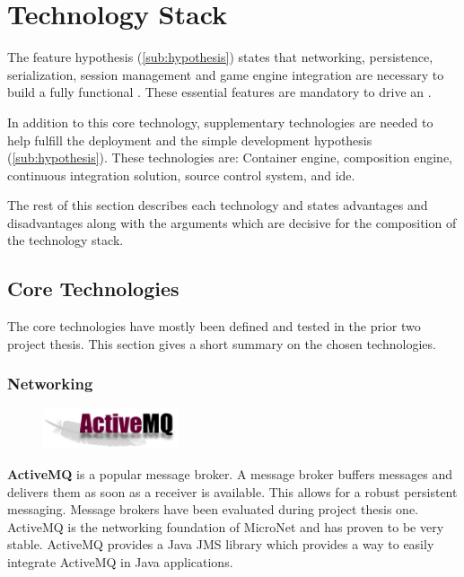 \section{Technology Stack}

The feature hypothesis (\autoref{sub:hypothesis}) states that networking,
persistence, serialization, session management and game engine integration are
necessary to build a fully functional \og{}. These essential features are
mandatory to drive an \og{}.

In addition to this core technology, supplementary technologies are needed to
help fulfill the deployment and the simple development hypothesis
(\autoref{sub:hypothesis}). These technologies are: Container engine,
composition engine, continuous integration solution, source control system, and
\gls{ide}.

The rest of this section describes each technology and states advantages and
disadvantages along with the arguments which are decisive for the composition
of the technology stack.

\subsection{Core Technologies}

The core technologies have mostly been defined and tested in the prior two
project thesis. This section gives a short summary on the chosen technologies.

\subsubsection{Networking}

\begin{figure}
    \includegraphics[width=4cm]{images/dependencies/activemq}
\end{figure}

\textbf{ActiveMQ} is a popular message broker. A message broker buffers
messages and delivers them as soon as a receiver is available. This allows for a
robust persistent messaging. Message brokers have been evaluated during
project thesis one. ActiveMQ is the networking foundation of MicroNet and
has proven to be very stable. ActiveMQ provides a Java JMS library which
provides a way to easily integrate ActiveMQ in Java applications.

